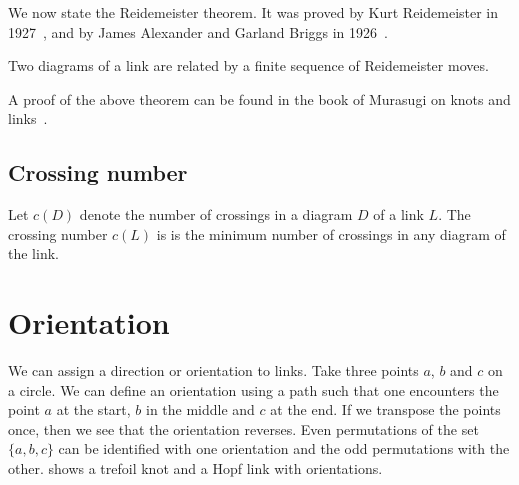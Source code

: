 We now state the Reidemeister theorem. It was proved by Kurt Reidemeister in 1927~\cite{reidemeister}, and by James Alexander and Garland Briggs in 1926~\cite{alexanderbriggs}.

\begin{thm}[Reidemeister]
    Two diagrams of a link are related by a finite sequence of Reidemeister moves.
\end{thm}

A proof of the above theorem can be found in the book of Murasugi on knots and links~\cite[chp.~4]{murasugi}.

\subsection{Crossing number}

Let \(c(D)\) denote the number of crossings in a diagram \(D\) of a link \(L\). The crossing number \(c(L)\) is is the minimum number of crossings in any diagram of the link.

\section{Orientation}

We can assign a direction or orientation to links. Take three points \(a\), \(b\) and \(c\) on a circle. We can define an orientation using a path such that one encounters the point \(a\) at the start, \(b\) in the middle and \(c\) at the end. If we transpose the points once, then we see that the orientation reverses. Even permutations of the set \(\{a,b,c\}\) can be identified with one orientation and the odd permutations with the other.  shows a trefoil knot and a Hopf link with orientations.

